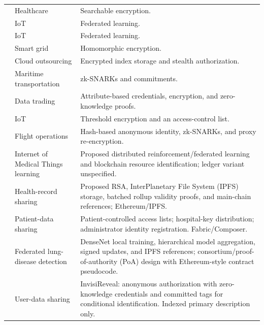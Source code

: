 \begin{longtable}{@{}>{\raggedright\arraybackslash}m{}>{\raggedright\arraybackslash}m{}>{\raggedright\arraybackslash}m{}@{}}
\cite{10.1109/jiot.2023.3287636} & Healthcare & Searchable encryption. \\
\addlinespace[5pt]
\cite{10.1109/jiot.2023.3295763} & IoT & Federated learning. \\
\addlinespace[5pt]
\cite{10.1109/jiot.2021.3134755} & IoT & Federated learning. \\
\addlinespace[5pt]
\cite{10.1109/jiot.2023.3247487} & Smart grid & Homomorphic encryption. \\
\addlinespace[5pt]
\cite{10.1109/tsc.2022.3199111} & Cloud outsourcing & Encrypted index storage and stealth authorization. \\
\addlinespace[5pt]
\cite{10.1109/tits.2022.3190487} & Maritime transportation & zk-SNARKs and commitments. \\
\addlinespace[5pt]
\cite{10.1109/tc.2023.3251846} & Data trading & Attribute-based credentials, encryption, and zero-knowledge proofs. \\
\addlinespace[5pt]
\cite{10.1109/jiot.2023.3307073} & IoT & Threshold encryption and an access-control list. \\
\addlinespace[5pt]
\cite{10.1109/jiot.2023.3296460} & Flight operations & Hash-based anonymous identity, zk-SNARKs, and proxy re-encryption. \\
\addlinespace[5pt]
\cite{updateDhasaratha2024IoMT} & Internet of Medical Things learning & Proposed distributed reinforcement/federated learning and blockchain resource identification; ledger variant unspecified. \\
\addlinespace[5pt]
\cite{updateMaZhang2024Rollup} & Health-record sharing & Proposed RSA, InterPlanetary File System (IPFS) storage, batched rollup validity proofs, and main-chain references; Ethereum/IPFS. \\
\addlinespace[5pt]
\cite{updateMasood2024Patient} & Patient-data sharing & Patient-controlled access lists; hospital-key distribution; administrator identity registration. Fabric/Composer. \\
\addlinespace[5pt]
\cite{updateGupta2024LungFL} & Federated lung-disease detection & DenseNet local training, hierarchical model aggregation, signed updates, and IPFS references; consortium/proof-of-authority (PoA) design with Ethereum-style contract pseudocode. \\
\addlinespace[5pt]
\cite{updateHu2024InvisiReveal} & User-data sharing & InvisiReveal: anonymous authorization with zero-knowledge credentials and committed tags for conditional identification. Indexed primary description only. \\

\end{longtable}
